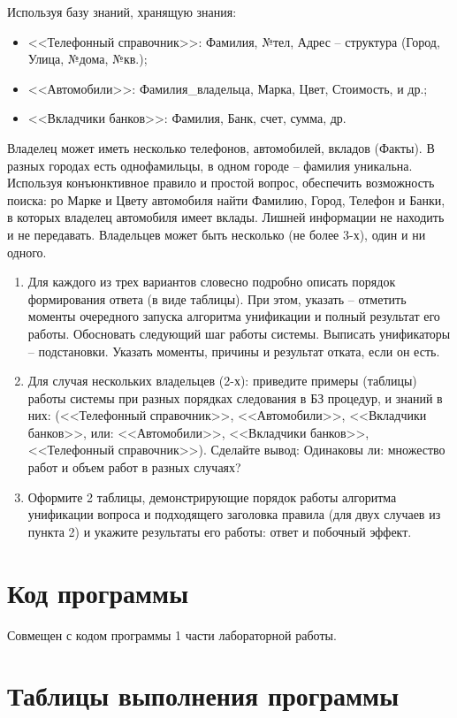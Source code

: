 \documentclass[14pt,a4paper]{scrreprt}
\begin{document}
Используя базу знаний, хранящую знания:
\begin{itemize}
	\item <<Телефонный справочник>>: Фамилия, №тел, Адрес -- структура (Город, Улица, №дома, №кв.);
	\item <<Автомобили>>: Фамилия\_владельца, Марка, Цвет, Стоимость, и др.;
	\item <<Вкладчики банков>>: Фамилия, Банк, счет, сумма, др.
\end{itemize}

Владелец может иметь несколько телефонов, автомобилей, вкладов (Факты). В разных
городах есть однофамильцы, в одном городе -- фамилия уникальна.
Используя конъюнктивное правило и простой вопрос, обеспечить возможность
поиска: ро Марке и Цвету автомобиля найти Фамилию, Город, Телефон и Банки, в которых
владелец автомобиля имеет вклады. Лишней информации не находить и не передавать. Владельцев может быть несколько (не более 3-х), один и ни одного.
\begin{enumerate}
	\item Для каждого из трех вариантов словесно подробно описать порядок формирования ответа (в виде таблицы). При этом, указать – отметить моменты очередного запуска алгоритма унификации и полный результат его работы. Обосновать следующий шаг работы системы. Выписать унификаторы -- подстановки. Указать моменты, причины и результат отката, если он есть.
	\item Для случая нескольких владельцев (2-х): приведите примеры (таблицы) работы системы при разных порядках следования в БЗ процедур, и знаний в них: (<<Телефонный справочник>>, <<Автомобили>>, <<Вкладчики банков>>, или: <<Автомобили>>, <<Вкладчики банков>>, <<Телефонный справочник>>). Сделайте вывод: Одинаковы ли: множество работ и объем работ в разных случаях?
	\item Оформите 2 таблицы, демонстрирующие порядок работы алгоритма унификации вопроса и подходящего заголовка правила (для двух случаев из пункта 2) и укажите результаты его работы: ответ и побочный эффект.
\end{enumerate}

\section{Код программы}

Совмещен с кодом программы 1 части лабораторной работы.

\section{Таблицы выполнения программы}
\end{document}
